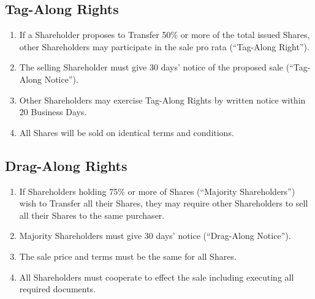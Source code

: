 \subsection{Tag-Along Rights}
\begin{enumerate}[label=(\alph*)]
\item If a Shareholder proposes to Transfer 50\% or more of the total issued Shares, other Shareholders may participate in the sale pro rata (``Tag-Along Right'').
\item The selling Shareholder must give 30 days' notice of the proposed sale (``Tag-Along Notice'').
\item Other Shareholders may exercise Tag-Along Rights by written notice within 20 Business Days.
\item All Shares will be sold on identical terms and conditions.
\end{enumerate}

\subsection{Drag-Along Rights}
\begin{enumerate}[label=(\alph*)]
\item If Shareholders holding 75\% or more of Shares (``Majority Shareholders'') wish to Transfer all their Shares, they may require other Shareholders to sell all their Shares to the same purchaser.
\item Majority Shareholders must give 30 days' notice (``Drag-Along Notice'').
\item The sale price and terms must be the same for all Shares.
\item All Shareholders must cooperate to effect the sale including executing all required documents.
\end{enumerate} 